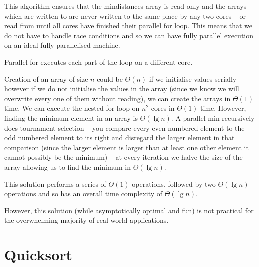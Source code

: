 \documentclass[10pt,\jkfside,a4paper]{article}
\begin{document}
\begin{enumerate}
\begin{enumerate}
This algorithm ensures that the mindistances array is read only and the arrays which are written to
are never written to the same place by any two cores -- or read from until all cores have finished their 
parallel for loop. This means that we do not have to handle race conditions and so we can have 
fully parallel execution on an ideal fully parallelised machine.

Parallel for executes each part of the loop on a different core. 

Creation of an array of size $n$ could be $\Theta(n)$ if we initialise values serially -- 
however if we do not initialise the values in the array (since we know we will overwrite 
every one of them without reading), we can create the arrays in 
$\Theta(1)$ time. We can execute the nested for loop on $n^2$ cores in $\Theta(1)$ time. 
However, finding the minimum element in an array is $\Theta(\lg n)$. A parallel min 
recursively does tournament 
selection -- you compare every even numbered element to the odd numbered element 
to its right and disregard the larger element in that comparison (since the larger element 
is larger than at least one other element it cannot possibly be the minimum) -- at every 
iteration we halve the size of the array allowing us to find the minimum in $\Theta(\lg n)$. 

This solution performs a series of $\Theta(1)$ operations, followed by two 
$\Theta(\lg n)$ operations and so has an overall time complexity of $\Theta(\lg n)$.

However, this solution (while asymptotically optimal and fun) is not practical for the overwhelming 
majority of real-world applications.

\end{enumerate}

\end{enumerate}

\section{Quicksort}
\end{document}
